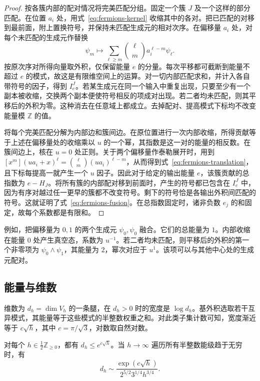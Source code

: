 \begin{proof}
按各簇内部的配对情况将完美匹配分组。固定一个簇 $J$ 及一个这样的部分匹配。在位置 $a_i$ 处，用式~\eqref{eq:fermions-kernel} 收缩其中的各对。把已匹配的对移到最前面，附上置换符号，并保持未匹配生成元的相对次序。在偏移量 $a_i$ 处，对每个未匹配的生成元作替换
\begin{equation}\label{eq:fermions-translation}
 \psi_m\longmapsto
          \sum_{\ell\ge m}\binom{\ell}{m}a_i^{\ell-m}\psi_\ell .
\end{equation}
按原次序对所得向量取外积，仅保留能量 $e$ 的分量。每次平移都可截断到能量不超过 $e$ 的模式，故这是有限维空间上的运算。对一切内部匹配求和，并计入各自带符号的因子，得到 $I_e^J$。若某生成元在同一个输入中重复出现，只要至少有一个副本被收缩，交换两个副本便使符号相反的项成对出现。若二者均未匹配，则其平移后的外积为零。这种消去在任意域上都成立。去掉配对、提高模式下标均不改变能量模 $\mathbb Z$ 的值。

将每个完美匹配分解为内部边和簇间边。在原位置进行一次内部收缩，所得贡献等于上述在偏移量处的收缩乘以 $u$ 的一个幂，其指数是这一对的能量的相反数。在簇间边上，核在 $u=0$ 处正则。关于两个偏移量作泰勒展开时，用到 $[x^m](u a_i+x)^\ell=\binom{\ell}{m}(u a_i)^{\ell-m}$，从而得到式~\eqref{eq:fermions-translation}，且下标每提高一就产生一个 $u$ 因子。因此对于给定的输出能量 $e$，该簇贡献的总指数为 $e-H_J$。将所有簇的内部配对移到前面时，产生的符号都已包含在 $I_e^J$ 中，因为有序对越过任一更早的簇都不改变符号。剩下的符号恰是各输出外积间匹配的符号。这就证明了式~\eqref{eq:fermions-fusion}。在总指数固定时，诸非负数 $e_j$ 的和固定，故每个系数都是有限和。
\end{proof}

例如，把偏移量为 $0,1$ 的两个生成元 $\psi_0,\psi_0$ 融合。它们的总能量为 $1$。内部收缩在能量 $0$ 处产生真空态，系数为 $u^{-1}$。若二者均未匹配，则平移后的外积的第一个非零项为 $\psi_0\wedge\psi_1$，其能量为 $2$，幂次对应于 $u^1$。该项可以与其他中心处的生成元配对。

\subsection{能量与维数}
维数为 $d_h=\dim V_h$ 的一条腿，在 $d_h>0$ 时的宽度是 $\log d_h$。基外积选取若干互异模式，其能量等于这些模式的半整数权重之和。对此类子集计数可知，宽度渐近等于 $c\sqrt h$，其中 $c=\pi/\sqrt3$，对数取自然对数。

\begin{lemma}[能级的维数]\label{lem:dimension}\label{lem:fermions-dimension}
对每个 $h\in\frac12\mathbb Z_{\ge0}$，都有 $d_h\le e^{c\sqrt h}$。当 $h\to\infty$ 遍历所有半整数能级趋于无穷时，有
\[
   d_h\sim
   \frac{\exp(c\sqrt h)}{2^{5/2}3^{1/4}h^{3/4}} .
\]
\end{lemma}

